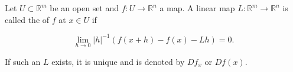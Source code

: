 Let $U \subset \mathbb{R}^m$ be an open set and $f: U \to \mathbb{R}^n$ a map. A linear map $L: \mathbb{R}^m \to \mathbb{R}^n$ is called the  of $f$ at $x \in U$ if

$$\lim_{h \to 0} |h|^{-1} \left( f(x + h) - f(x) - Lh \right) = 0.$$

If such an $L$ exists, it is unique and is denoted by $Df_x$ or $Df(x)$.
